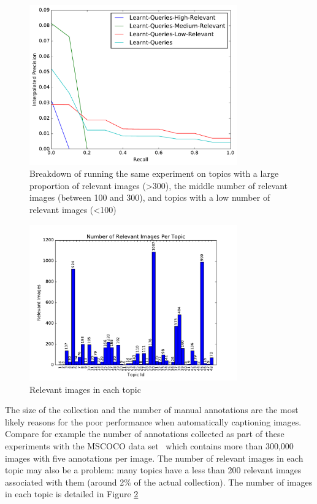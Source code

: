 \FloatBarrier
\begin{figure}[h]
    \centering
    \includegraphics[width=0.8\textwidth]{graphs/learnt-queries}
    \caption{Breakdown of running the same experiment on topics with a large proportion of relevant images (\textgreater 300), the middle number of relevant images (between 100 and 300), and topics with a low number of relevant images (\textless 100)}
    \label{fig:learnt-queries}
\end{figure}

\begin{figure}[h]
    \centering
    \includegraphics[width=0.8\textwidth]{graphs/relevant-images}
    \caption{Relevant images in each topic}
    \label{fig:relevant-images}
\end{figure}
\FloatBarrier

The size of the collection and the number of manual annotations are the most likely reasons for the poor performance when automatically captioning images. Compare for example the number of annotations collected as part of these experiments with the MSCOCO data set~\cite{lin2014microsoft} which contains more than 300,000 images with five annotations per image. The number of relevant images in each topic may also be a problem: many topics have a less than 200 relevant images associated with them (around 2\% of the actual collection). The number of images in each topic is detailed in Figure \ref{fig:relevant-images}

